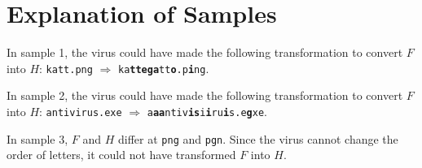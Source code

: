 \section*{Explanation of Samples}
In sample 1, the virus could have made the following transformation to convert $F$ into $H$:
\texttt{katt.png} $\Rightarrow$ \texttt{ka\textbf{ttega}tt\textbf{o}.p\textbf{i}ng}.

In sample 2, the virus could have made the following transformation to convert $F$ into $H$:
\texttt{antivirus.exe} $\Rightarrow$ \texttt{a\textbf{aa}ntiv\textbf{is}i\textbf{i}ru\textbf{i}s.e\textbf{g}xe}.

In sample 3, $F$ and $H$ differ at \texttt{png} and \texttt{pgn}. Since the virus cannot change the order of letters, it could not have transformed $F$ into $H$.
